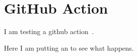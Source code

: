 \section{GitHub Action}

I am testing a github action~\cite{latex-action}.

Here I am putting an \error to see what happens.
